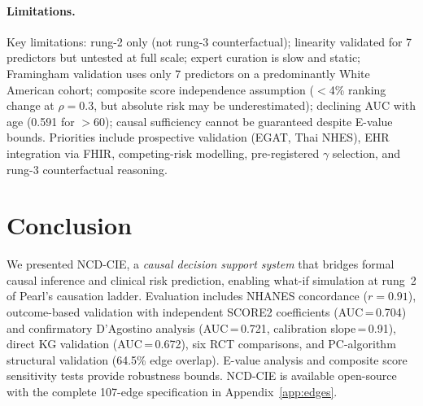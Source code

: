 \documentclass[runningheads]{llncs}
\begin{document}
\paragraph{Limitations.}
Key limitations: rung-2 only (not rung-3 counterfactual); linearity
validated for 7 predictors but untested at full scale; expert curation
is slow and static; Framingham validation uses only 7 predictors on a
predominantly White American cohort; composite score independence
assumption ($<$4\% ranking change at $\rho=0.3$, but absolute risk
may be underestimated); declining AUC with age (0.591 for $>$60);
causal sufficiency cannot be guaranteed despite E-value bounds.
Priorities include prospective validation (EGAT, Thai NHES),
EHR integration via FHIR, competing-risk modelling,
pre-registered $\gamma$ selection, and rung-3 counterfactual
reasoning.

\section{Conclusion}\label{sec:conclusion}

We presented NCD-CIE, a \emph{causal decision support system}
that bridges formal causal inference and clinical risk prediction,
enabling what-if simulation at rung~2 of Pearl's causation ladder.
Evaluation includes NHANES concordance ($r = 0.91$), outcome-based
validation with independent SCORE2 coefficients (AUC\,=\,0.704)
and confirmatory D'Agostino analysis (AUC\,=\,0.721,
calibration slope\,=\,0.91), direct KG validation (AUC\,=\,0.672),
six RCT comparisons, and PC-algorithm structural validation
(64.5\% edge overlap).
E-value analysis and composite score sensitivity tests provide
robustness bounds.
NCD-CIE is available open-source with the complete 107-edge
specification in Appendix~\ref{app:edges}.
\end{document}
